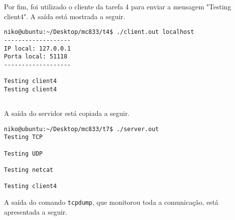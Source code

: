 \documentclass[a4paper,10pt]{article}
\begin{document}
Por fim, foi utilizado o cliente da tarefa 4 para enviar a mensagem "Testing client4". A saída está mostrada a seguir.

\begin{lstlisting}
niko@ubuntu:~/Desktop/mc833/t4$ ./client.out localhost
-------------------
IP local: 127.0.0.1
Porta local: 51118
-------------------

Testing client4
Testing client4


\end{lstlisting}

A saída do servidor está copiada a seguir.

\begin{lstlisting}
niko@ubuntu:~/Desktop/mc833/t7$ ./server.out 
Testing TCP

Testing UDP

Testing netcat

Testing client4

\end{lstlisting}

A saída do comando {\tt tcpdump}, que monitorou toda a comunicação, está apresentada a seguir.
\end{document}
